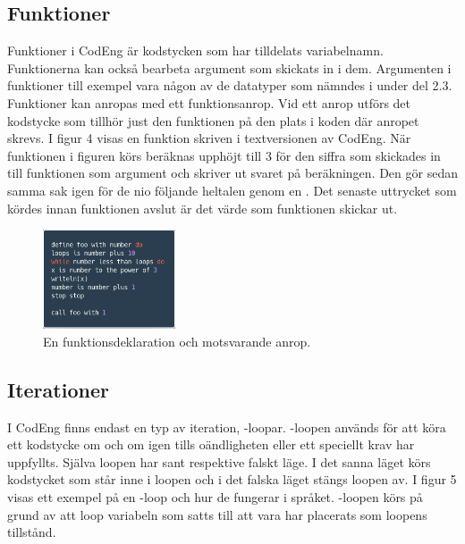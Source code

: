 \documentclass{article}
\begin{document}
\subsection{Funktioner}
Funktioner i CodEng är kodstycken som har tilldelats variabelnamn. Funktionerna kan också bearbeta argument som skickats in i dem. Argumenten i funktioner till exempel vara någon av de datatyper som nämndes i under del 2.3. Funktioner kan anropas med ett funktionsanrop. Vid ett anrop utförs det kodstycke som tillhör just den funktionen på den plats i koden där anropet skrevs. I figur 4 visas en funktion skriven i textversionen av CodEng. När funktionen i figuren körs beräknas upphöjt till 3 för den siffra som skickades in till funktionen som argument och skriver ut svaret på beräkningen. Den gör sedan samma sak igen för de nio följande heltalen genom en . Det senaste uttrycket som kördes innan funktionen avslut är det värde som funktionen skickar ut. 

\FloatBarrier
\begin{figure}[h!]
    \centering
    \includegraphics[width=0.35\textwidth]{function.png}
    \caption{En funktionsdeklaration och motsvarande anrop.}
    \label{fig:func1}
\end{figure}
\FloatBarrier


\subsection{Iterationer}
I CodEng finns endast en typ av iteration, -loopar. -loopen används för att köra ett kodstycke om och om igen tills oändligheten eller ett speciellt krav har uppfyllts. Själva loopen har sant respektive falskt läge. I det sanna läget körs kodstycket som står inne i loopen och i det falska läget stängs loopen av. I figur 5 visas ett exempel på en -loop och hur de fungerar i språket. -loopen körs på grund av att loop variabeln som satts till att vara  har placerats som loopens tillstånd. 
\end{document}
